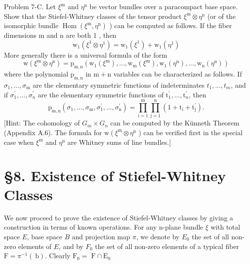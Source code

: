 \documentclass[10pt]{article}
\begin{document}
Problem 7-C. Let $\xi^{\mathrm{m}}$ and $\eta^{\mathrm{n}}$ be vector bundles over a paracompact base space. Show that the Stiefel-Whitney classes of the tensor product $\xi^{\mathrm{m}} \otimes \eta^{\mathrm{n}}$ (or of the isomorphic bundle $\operatorname{Hom}\left(\xi^{\mathrm{m}}, \eta^{\mathrm{n}}\right)$ ) can be computed as follows. If the fiber dimensions $\mathrm{m}$ and $\mathrm{n}$ are both 1 , then
$$
\mathrm{w}_{1}\left(\xi^{1} \otimes \eta^{1}\right)=\mathrm{w}_{1}\left(\xi^{1}\right)+\mathrm{w}_{1}\left(\eta^{1}\right)
$$
More generally there is a universal formula of the form
$$
\mathrm{w}\left(\xi^{\mathrm{m}} \otimes \eta^{\mathrm{n}}\right)=\mathrm{p}_{\mathrm{m}, \mathrm{n}}\left(\mathrm{w}_{1}\left(\xi^{\mathrm{m}}\right), \ldots, \mathrm{w}_{\mathrm{m}}\left(\xi^{\mathrm{m}}\right), \mathrm{w}_{1}\left(\eta^{\mathrm{n}}\right), \ldots, \mathrm{w}_{\mathrm{n}}\left(\eta^{\mathrm{n}}\right)\right)
$$
where the polynomial $\mathrm{p}_{\mathrm{m}, \mathrm{n}}$ in $\mathrm{m}+\mathrm{n}$ variables can be characterized as follows. If $\sigma_{1}, \ldots, \sigma_{\mathrm{m}}$ are the elementary symmetric functions of indeterminates $t_{1}, \ldots, t_{m}$, and if $\sigma_{1}^{\prime}, \ldots, \sigma_{n}^{\prime}$ are the elementary symmetric functions of $\mathrm{t}_{1}^{\prime}, \ldots, \mathrm{t}_{n}^{\prime}$, then
$$
\mathrm{p}_{\mathrm{m}, \mathrm{n}}\left(\sigma_{1}, \ldots, \sigma_{\mathrm{m}}, \sigma_{1}^{\prime}, \ldots, \sigma_{\mathrm{n}}^{\prime}\right)=\prod_{\mathrm{i}=1}^{\mathrm{m}} \prod_{\mathrm{j}=1}^{\mathrm{n}}\left(1+\mathrm{t}_{\mathrm{i}}+\mathrm{t}_{\mathrm{j}}^{\prime}\right) .
$$
[Hint: The cohomology of $G_{m} \times G_{n}$ can be computed by the Künneth Theorem (Appendix A.6). The formula for $\mathrm{w}\left(\xi^{\mathrm{m}} \otimes \eta^{\mathrm{n}}\right.$ ) can be verified first in the special case when $\xi^{\mathrm{m}}$ and $\eta^{\mathrm{n}}$ are Whitney sums of line bundles.]

\section{§8. Existence of Stiefel-Whitney Classes}
We now proceed to prove the existence of Stiefel-Whitney classes by giving a construction in terms of known operations. For any n-plane bundle $\xi$ with total space $E$, base space $B$ and projection map $\pi$, we denote by $E_{0}$ the set of all non-zero elements of $E$, and by $F_{0}$ the set of all non-zero elements of a typical fiber $\mathrm{F}=\pi^{-1}(\mathrm{~b})$. Clearly $\mathrm{F}_{0}=$ $\mathrm{F} \cap \mathrm{E}_{0}$
\end{document}
